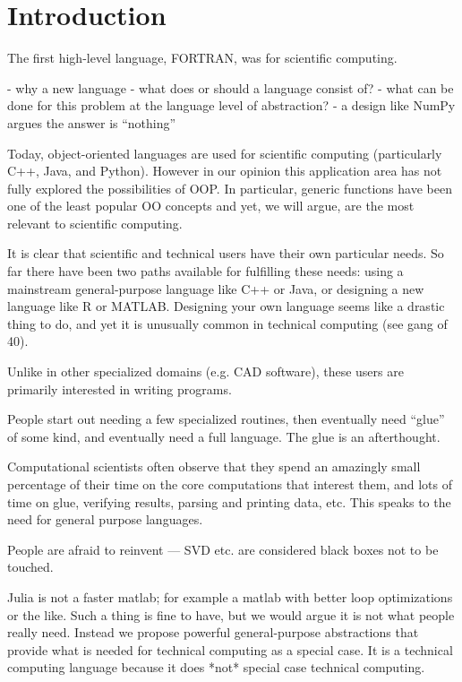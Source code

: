 \chapter{Introduction}

The first high-level language, FORTRAN, was for scientific computing.

- why a new language
- what does or should a language consist of?
- what can be done for this problem at the language level of abstraction?
  - a design like NumPy argues the answer is ``nothing''

Today, object-oriented languages are used for scientific computing
(particularly C++, Java, and Python). However in our opinion this
application area has not fully explored the possibilities of OOP. In
particular, generic functions have been one of the least popular
OO concepts and yet, we will argue, are the most relevant to scientific
computing.

It is clear that scientific and technical users have their own particular
needs. So far there have been two paths available for fulfilling these
needs: using a mainstream general-purpose language like C++ or Java, or
designing a new language like R or MATLAB. Designing your own language
seems like a drastic thing to do, and yet it is unusually common in
technical computing (see gang of 40).

Unlike in other specialized domains (e.g. CAD software), these users
are primarily interested in writing programs.

People start out needing a few specialized routines, then eventually
need ``glue'' of some kind, and eventually need a full language.
The glue is an afterthought.

Computational scientists often observe that they spend an amazingly
small percentage of their time on the core computations that
interest them, and lots of time on glue, verifying results,
parsing and printing data, etc. This speaks to the need for
general purpose languages.

People are afraid to reinvent --- SVD etc. are considered black
boxes not to be touched.

Julia is not a faster matlab; for example a matlab with better
loop optimizations or the like. Such a thing is fine to have,
but we would argue it is not what people really need.
Instead we propose powerful general-purpose abstractions that
provide what is needed for technical computing as a special case.
It is a technical computing language because it does *not*
special case technical computing.


